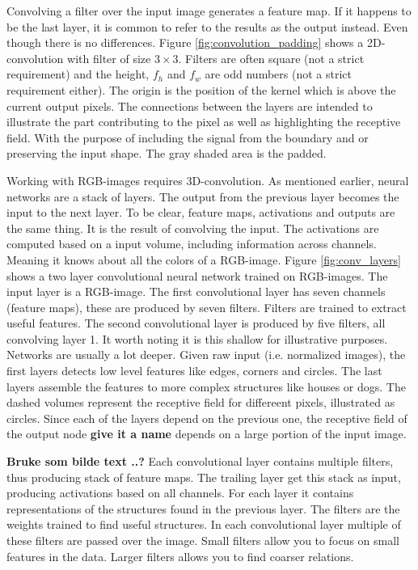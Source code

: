 \documentclass{article}
\begin{document}

Convolving a filter over the input image generates a feature map. If it happens to be the last layer, it is common to refer to the results as the output instead. Even though there is no differences. Figure \ref{fig:convolution_padding} shows a 2D-convolution with filter of size $3\times 3$. Filters are often square (not a strict requirement) and the height, $f_h$ and $f_w$ are odd numbers (not a strict requirement either). The origin is the position of the kernel which is above the current output pixels. The connections between the layers are intended to illustrate the part contributing to the pixel as well as highlighting the receptive field. With the purpose of including the signal from the boundary and or preserving the input shape. The gray shaded area is the padded. 

Working with RGB-images requires 3D-convolution. As mentioned earlier, neural networks are a stack of layers. The output from the previous layer becomes the input to the next layer. To be clear, feature maps, activations and outputs are the same thing. It is the result of convolving the input. The activations are computed based on a input volume, including information across channels. Meaning it knows about all the colors of a RGB-image. Figure \ref{fig:conv_layers} shows a two layer convolutional neural network trained on RGB-images. The input layer is a RGB-image. The first convolutional layer has seven channels (feature maps), these are produced by seven filters. Filters are trained to extract useful features. The second convolutional layer is produced by five filters, all convolving layer 1. It worth noting it is this shallow for illustrative purposes. Networks are usually a lot deeper. Given raw input (i.e. normalized images), the first layers detects low level features like edges, corners and circles. The last layers assemble the features to more complex structures like houses or dogs. The dashed volumes represent the receptive field for differeent pixels, illustrated as circles. Since each of the layers depend on the previous one, the receptive field of the output node \textbf{give it a name} depends on a large portion of the input image.

\textbf{Bruke som bilde text ..?} Each convolutional layer contains multiple filters, thus producing stack of feature maps. The trailing layer get this stack as input, producing activations based on all channels. For each layer it contains representations of the structures found in the previous layer. The filters are the weights trained to find useful structures. In each convolutional layer multiple of these filters are passed over the image. Small filters allow you to focus on small features in the data. Larger filters allows you to find coarser relations. 
\end{document}
